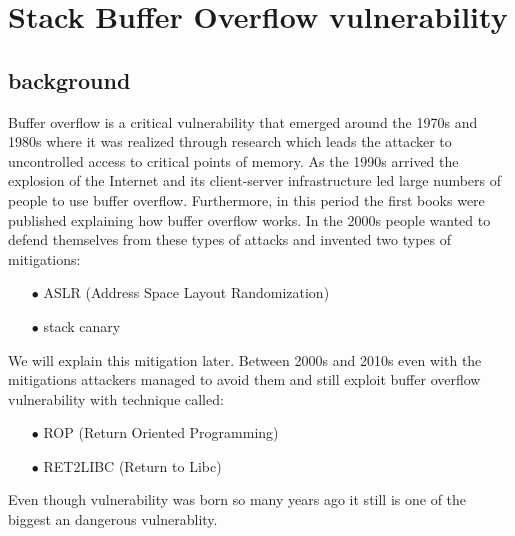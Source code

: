\documentclass{report}
\begin{document}
    \chapter{Stack Buffer Overflow vulnerability}
    \section{background} %
    Buffer overflow is a critical vulnerability that emerged around the 1970s and 1980s where it was 
    realized through research which leads the attacker to uncontrolled access to critical points of memory.\newline
    As the 1990s arrived the explosion of the Internet and its client-server infrastructure led large numbers of people to use buffer overflow.\newline
    Furthermore, in this period the first books were published explaining how buffer overflow works.\newline
    In the 2000s people wanted to defend themselves from these types of attacks and invented two types of mitigations:\newline
    \begin{itemize}
        \item[$\bullet$] ASLR (Address Space Layout Randomization)
        \item[$\bullet$] stack canary 
    \end{itemize}
    We will explain this mitigation later.\newline
    Between 2000s and 2010s even with the mitigations attackers managed to avoid them and still exploit buffer overflow vulnerability with technique called:\newline
        \begin{itemize}
        \item[$\bullet$] ROP (Return Oriented Programming)
        \item[$\bullet$] RET2LIBC (Return to Libc)
    \end{itemize}
    Even though vulnerability was born so many years ago it still is one of the biggest an dangerous vulnerablity.
    \clearpage
\end{document}
